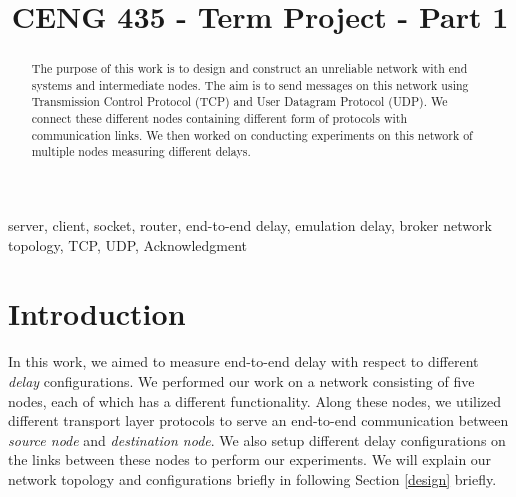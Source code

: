 \documentclass[conference]{IEEEtran}
\begin{document}
\title{CENG 435 - Term Project - Part 1\\}

\author{
    \and
}

\maketitle

\begin{abstract}
\par The purpose of this work is to design and construct an unreliable network with end systems and intermediate nodes. The aim is to send messages on this network using Transmission Control Protocol (TCP) and User Datagram Protocol (UDP). We connect these different nodes containing different form of protocols with communication links. We then worked on conducting experiments on this network of multiple nodes measuring different delays.
\end{abstract}

\begin{IEEEkeywords}
server, client, socket, router, end-to-end delay, emulation delay, broker network topology, TCP, UDP, Acknowledgment
\end{IEEEkeywords}

\section{Introduction} \label{introduction}
\par In this work, we aimed to measure end-to-end delay with respect to different \textit{delay} configurations. We performed our work on a network consisting of five nodes, each of which has a different functionality. Along these nodes, we utilized different transport layer protocols to serve an end-to-end communication between \textit{source node} and \textit{destination node}. We also setup different delay configurations on the links between these nodes to perform our experiments. We will explain our network topology and configurations briefly in following Section \ref{design} briefly.
\end{document}
